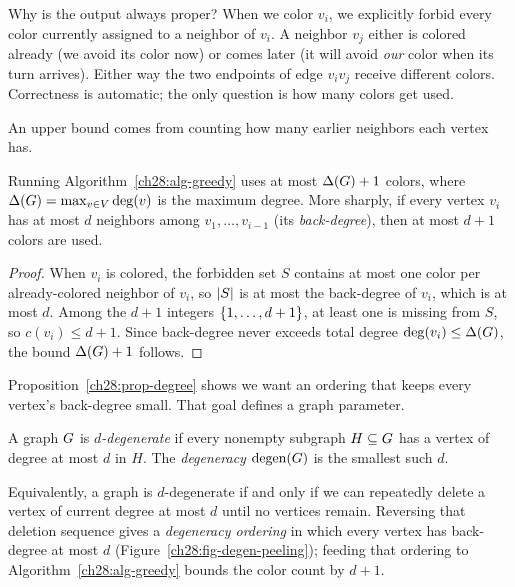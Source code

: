 \begin{whybox}
Why is the output always proper? When we color $v_i$, we explicitly forbid every
color currently assigned to a neighbor of $v_i$. A neighbor $v_j$ either is colored
already (we avoid its color now) or comes later (it will avoid \emph{our} color
when its turn arrives). Either way the two endpoints of edge $v_iv_j$ receive different colors. Correctness is automatic; the only question is how many colors get used.
\end{whybox}

An upper bound comes from counting how many earlier neighbors each vertex has.

\begin{proposition}
\label{ch28:prop-degree}
Running Algorithm~\ref{ch28:alg-greedy} uses at most $\Delta(G)+1$ colors, where
$\Delta(G) = \max_{v\in V}\deg(v)$ is the maximum degree. More sharply, if every vertex $v_i$ has at most $d$
neighbors among $v_1,\dots,v_{i-1}$ (its \emph{back-degree}), then at most $d+1$
colors are used.
\end{proposition}

\begin{proof}
When $v_i$ is colored, the forbidden set $S$ contains at most one color per
already-colored neighbor of $v_i$, so $\lvert S\rvert$ is at most the back-degree of $v_i$, which is at most $d$. Among the $d+1$ integers $\{1,\dots,d+1\}$, at least one is missing from $S$, so $c(v_i)\le d+1$. Since back-degree never
exceeds total degree $\deg(v_i)\le\Delta(G)$, the bound $\Delta(G)+1$ follows.
\end{proof}

Proposition~\ref{ch28:prop-degree} shows we want an ordering that keeps
every vertex's back-degree small. That goal defines a graph parameter.

\begin{definition}[Degeneracy]
\label{ch28:def-degen}
A graph $G$ is \emph{$d$-degenerate} if every nonempty subgraph $H\subseteq G$ has a vertex of degree at most
$d$ in $H$. The \emph{degeneracy} $\operatorname{degen}(G)$ is the smallest such $d$.
\end{definition}

Equivalently, a graph is $d$-degenerate if and only if we can repeatedly delete a vertex of
current degree at most $d$ until no vertices remain. Reversing that deletion sequence gives a
\emph{degeneracy ordering} in which every vertex has back-degree at most $d$ (Figure~\ref{ch28:fig-degen-peeling}); feeding that ordering to
Algorithm~\ref{ch28:alg-greedy} bounds the color count by $d+1$.

